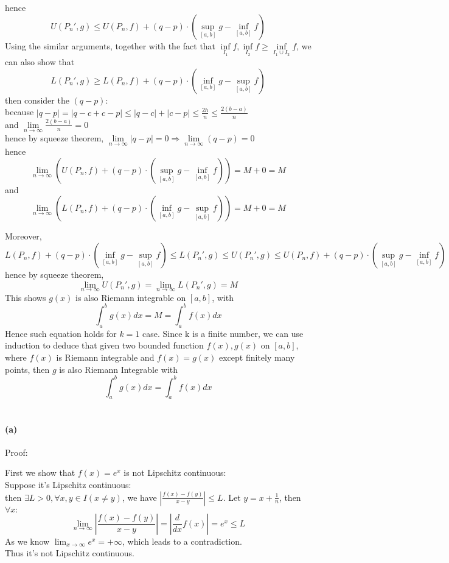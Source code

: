 \documentclass{article}
\def\to{\rightarrow}
\def\imply{\Longrightarrow}
\def\oo{\infty}
\begin{document}
hence
$$U(P_n', g)\le U(P_n, f)+(q-p)\cdot (\sup\limits_{[a, b]}g-\inf\limits_{[a, b]}f)$$
Using the similar arguments, together with the fact that $\inf\limits_{I_1}f, \inf\limits_{I_2}f\ge \inf\limits_{I_1\cup I_2}f$, we can also show that 
$$	L(P_n', g)\ge L(P_n, f)+(q-p)\cdot (\inf\limits_{[a, b]}g-\sup\limits_{[a, b]}f)$$
then consider the $(q-p)$:
\\because $|q-p|=|q-c+c-p|\le |q-c|+|c-p|\le \frac{2h}{n}\le \frac{2(b-a)}{n}$
\\and $\lim\limits_{n\to\oo}\frac{2(b-a)}{n}=0$
\\hence by squeeze theorem, $\lim\limits_{n\to\oo}|q-p|=0\imply \lim\limits_{n\to\infty}(q-p)=0$
\\hence
$$\lim\limits_{n\to \infty}\left( U(P_n, f)+(q-p)\cdot (\sup\limits_{
[a, b]}g-\inf\limits_{[a, b]}f)\right)=M+0=M$$
and 
$$\lim\limits_{n\to \oo}\left(L(P_n, f)+(q-p)\cdot (\inf\limits_{[a, b]}g-\sup\limits_{[a, b]}f)\right)=M+0=M$$

Moreover, 
$$L(P_n, f)+(q-p)\cdot (\inf\limits_{[a, b]}g-\sup\limits_{[a, b]}f)\le L(P_n', g)\le U(P_n', g)\le U(P_n, f)+(q-p)\cdot (\sup\limits_{
	[a, b]}g-\inf\limits_{[a, b]}f)$$
hence by squeeze theorem,
$$\lim\limits_{n\to\oo}U(P_n', g)=\lim\limits_{n\to\oo}L(P_n',g)=M$$
This shows $g(x)$ is also Riemann integrable on $[a, b]$, with
$$\int_{a}^{b}g(x)dx=M=\int_{a}^{b}f(x)dx$$
Hence such equation holds for $k=1$ case. Since k is a finite number, we can use induction to deduce that given two bounded function $f(x),g(x)$ on $[a, b]$, where $f(x) $ is Riemann integrable and $f(x)=g(x)$ except finitely many points, then $g$ is also Riemann Integrable with 
$$\int_{a}^{b}g(x)dx=\int_{a}^{b}f(x)dx$$ 

\section{} %
\paragraph{(a)} Proof:

First we  show that $f(x)=e^x$ is not Lipschitz continuous:\\
Suppose it's Lipschitz continuous:\\
then $\exists L>0,\forall x,y\in I(x\neq y)$, we have
$\left|\frac{f(x)-f(y)}{x-y}\right|\leq L.$
Let $y=x+\frac{1}{n}$, then
$\forall x:$
$$\lim_{n\to\infty}\left|\frac{f(x)-f(y)}{x-y}\right|=\left|\frac{d}{dx}f(x)\right|=e^x
\leq L$$
As we know $\lim_{x\to\infty}e^x=+\infty$, which leads to a contradiction.\\
Thus it's not Lipschitz continuous.\\
\end{document}
